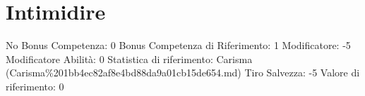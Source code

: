 \section{Intimidire}\label{intimidire}

\begin{description}
\tightlist
\item[Tags: ABI]
No Bonus Competenza: 0 Bonus Competenza di Riferimento: 1 Modificatore:
-5 Modificatore Abilità: 0 Statistica di riferimento: Carisma
(Carisma\%201bb4ec82af8e4bd88da9a01cb15de654.md) Tiro Salvezza: -5
Valore di riferimento: 0
\end{description}
